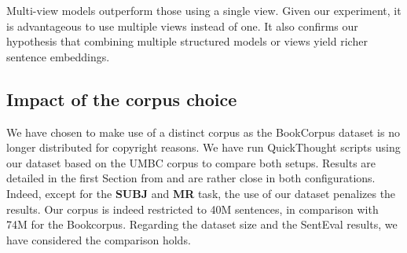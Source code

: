 Multi-view models outperform those using a single view. Given our experiment, it is advantageous to use multiple views instead of one. It also confirms our hypothesis that combining multiple structured models or views yield richer sentence embeddings.

\begin{table}[!htb]
\footnotesize
\caption{\textbf{Impact of the multi-view.} The first section corresponds to single-view setups for which $f$ and $g$ are the same views. The second section reports multi-view models. For each model, we report the average score on the SentEval benchmark.}
\label{table:multi-view}
\end{table}

\subsection{Impact of the corpus choice}

We have chosen to make use of a distinct corpus as the BookCorpus dataset is no longer distributed for copyright reasons. We have run QuickThought scripts \parencite{logeswaran_18} using our dataset based on the UMBC corpus to compare both setups. Results are detailed in the first Section from  and are rather close in both configurations. Indeed, except for the \textbf{SUBJ} and \textbf{MR} task, the use of our dataset penalizes the results. Our corpus is indeed restricted to 40M sentences, in comparison with 74M for the Bookcorpus. Regarding the dataset size and the SentEval results, we have considered the comparison holds.

